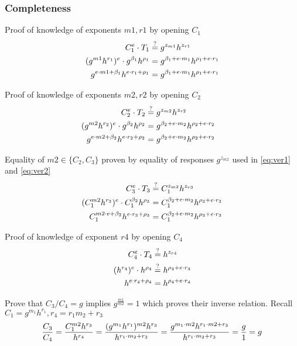 \subsubsection{Completeness}
Proof of knowledge of exponents $m1, r1$ by opening $C_1$ 
\begin{align}
    C_1^e \cdot T_1 &\stackrel{?}{=} g^{z_{m1}} h^{z_{r1}} \notag \\
    (g^{m1}h^{r_1})^e \cdot g^{\beta_1}h^{\rho_1} &= g^{\beta_1 + e \cdot m_1} h^{\rho_1 + e \cdot r_1} \notag \\
    g^{e \cdot m1 + \beta_1}h^{e \cdot r_1 + \rho_1} &= g^{\beta_1 + e \cdot m_1} h^{\rho_1 + e \cdot r_1} \notag 
\end{align}

Proof of knowledge of exponents $m2, r2$ by opening $C_2$ 
\begin{align}
    C_2^e \cdot T_2 &\stackrel{?}{=} g^{z_{m2}} h^{z_{r2}} && \label{eq:ver1} \\
    (g^{m2}h^{r_2})^e \cdot g^{\beta_2}h^{\rho_2} &= g^{\beta_2 + e \cdot m_2} h^{\rho_2 + e \cdot r_2} \notag \\
    g^{e \cdot m2 + \beta_2}h^{e \cdot r_2 + \rho_2} &= g^{\beta_2 + e \cdot m_2} h^{\rho_2 + e \cdot r_2} \notag 
\end{align}


Equality of $m2 \in \{C_2, C_3\}$ proven by equality of responses $g^{z_{m2}}$ used in \eqref{eq:ver1} and \eqref{eq:ver2}
\begin{align}
    C_3^e \cdot T_3 &\stackrel{?}{=} C_1^{z_{m2}} h^{z_{r3}} \notag \\
    (C_1^{m2}h^{r_3})^e \cdot C_1^{\beta_2}h^{\rho_3} &= C_1^{\beta_2 + e \cdot m_2} h^{\rho_3 + e \cdot r_3} \label{eq:ver2} \\
    C_1^{m2 \cdot e + \beta_2}h^{e \cdot r_3 + \rho_3} &= C_1^{\beta_2 + e \cdot m_2} h^{\rho_3 + e \cdot r_3} \notag
\end{align}

Proof of knowledge of exponent $r4$ by opening $C_4$ 
\begin{align}
    C_4^e \cdot T_4 &\stackrel{?}{=} h^{z_{r4}} \notag \\
    (h^{r_4})^e \cdot h^{\rho_4} &\stackrel{?}{=} h^{\rho_4 + e \cdot r_4} \notag \\
    h^{e \cdot r_4 + \rho_4} &= h^{\rho_4 + e \cdot r_4} \notag
\end{align}

Prove that $C_3/C_4 = g$ implies $g^{\frac{m1}{m2}} = 1$ which proves their inverse relation. Recall $C_1 = g^{m_1}h^{r_1}, r_4 = r_1m_2 + r_3$
\begin{align}
    \dfrac{C_3}{C_4} = \dfrac{C_1^{m2}h^{r_3}}{h^{r_4}} = \dfrac{(g^{m_1}h^{r_1})^{m2}h^{r_3}}{h^{r_1 \cdot m_2 + r_3}} = \dfrac{g^{m_1\cdot m2}h^{r_1\cdot m2 + r_3}}{h^{r_1 \cdot m_2 + r_3}} = \dfrac{g}{1} = g \notag \\
\end{align}

